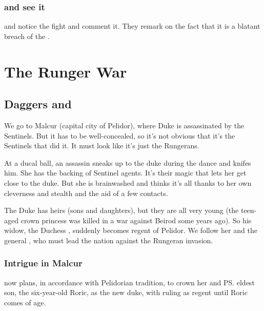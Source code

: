 \begin{garbage}
\subsubsection{\Psyrex{} and \Secherdamon{} see it}
\Psyrex{} and \Secherdamon{} notice the fight and comment it. 
They remark on the fact that it is a blatant breach of the \charade. 















\section{The Runger War}
\subsection{Daggers and \Daemons}
We go to Malcur (capital city of Pelidor), where Duke \Icor{} is assassinated by the Sentinels. 
But it has to be well-concealed, so it's not obvious that it's the Sentinels that did it. 
It must look like it's just the Rungerans. 

At a ducal ball, an assassin sneaks up to the duke during the dance and knifes him. She has the backing of Sentinel agents. It's their magic that lets her get close to the duke. But she is brainwashed and thinks it's all thanks to her own cleverness and stealth and the aid of a few contacts. 

The Duke has heirs (sons and daughters), but they are all very young (the teen-aged crown princess was killed in a war against Beirod some years ago). 
So his widow, the Duchess \Tiroco, suddenly becomes regent of Pelidor. 
We follow her and the general , who must lead the nation against the Rungeran invasion. 






\subsubsection{Intrigue in Malcur}
\Tiroco{} now plans, in accordance with Pelidorian tradition, to crown her and \ps{\Icor} eldest son, the six-year-old Roric, as the new duke, with \Tiroco{} ruling as regent until Roric comes of age. 


\end{garbage}
